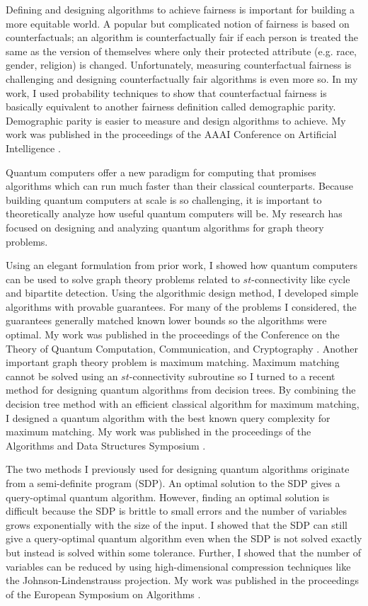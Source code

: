 \documentclass[11pt]{article}
\begin{document}
Defining and designing algorithms to achieve fairness is important for building a more equitable world.
A popular but complicated notion of fairness is based on counterfactuals; an algorithm is counterfactually fair if each person is treated the same as the version of themselves where only their protected attribute (e.g. race, gender, religion) is changed.
Unfortunately, measuring counterfactual fairness is challenging and designing counterfactually fair algorithms is even more so.
In my work, I used probability techniques to show that counterfactual fairness is basically equivalent to another fairness definition called demographic parity.
Demographic parity is easier to measure and design algorithms to achieve.
My work was published in the proceedings of the AAAI Conference on Artificial Intelligence \cite{rosenblatt2023counterfactual}.


\noindent Quantum computers offer a new paradigm for computing that promises algorithms which can run much faster than their classical counterparts.
Because building quantum computers at scale is so challenging, it is important to theoretically analyze how useful quantum computers will be.
My research has focused on designing and analyzing quantum algorithms for graph theory problems.

Using an elegant formulation from prior work, I showed how quantum computers can be used to solve graph theory problems related to $st$-connectivity like cycle and bipartite detection.
Using the algorithmic design method, I developed simple algorithms with provable guarantees.
For many of the problems I considered, the guarantees generally matched known lower bounds so the algorithms were optimal.
My work was published in the proceedings of the Conference on the Theory of Quantum Computation, Communication, and Cryptography \cite{delorenzo2019applications}.
Another important graph theory problem is maximum matching.
Maximum matching cannot be solved using an $st$-connectivity subroutine so I turned to a recent method for designing quantum algorithms from decision trees.
By combining the decision tree method with an efficient classical algorithm for maximum matching, I designed a quantum algorithm with the best known query complexity for maximum matching.
My work was published in the proceedings of the Algorithms and Data Structures Symposium \cite{kimmel2021query}.

The two methods I previously used for designing quantum algorithms originate from a semi-definite program (SDP).
An optimal solution to the SDP gives a query-optimal quantum algorithm.
However, finding an optimal solution is difficult because the SDP is brittle to small errors and the number of variables grows exponentially with the size of the input.
I showed that the SDP can still give a query-optimal quantum algorithm even when the SDP is not solved exactly but instead is solved within some tolerance.
Further, I showed that the number of variables can be reduced by using high-dimensional compression techniques like the Johnson-Lindenstrauss projection.
My work was published in the proceedings of the European Symposium on Algorithms \cite{czekanski2023robust}.
\end{document}
